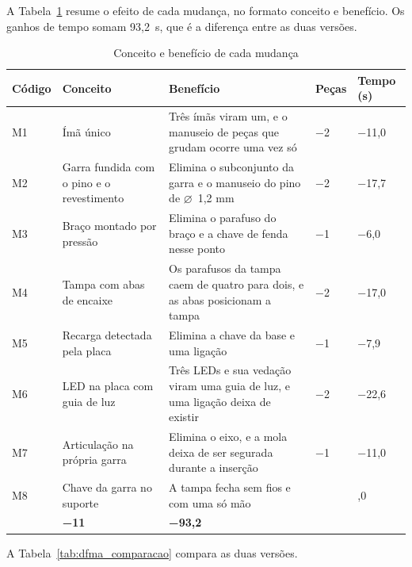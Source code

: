 A Tabela~\ref{tab:dfma_beneficios} resume o efeito de cada mudança, no formato conceito e benefício. Os ganhos de tempo somam 93,2~s, que é a diferença entre as duas versões.

\begin{table}[!htb]
    \centering
    \caption{Conceito e benefício de cada mudança}
    \label{tab:dfma_beneficios}
    \footnotesize
    \renewcommand{\arraystretch}{1.3}
    \begin{tabularx}{\textwidth}{@{}
        >{\RaggedRight\arraybackslash}p{1.1cm}
        >{\RaggedRight\arraybackslash}p{4.4cm}
        >{\RaggedRight\arraybackslash}X
        >{\centering\arraybackslash}p{1.2cm}
        >{\centering\arraybackslash}p{1.7cm}@{}}
        \toprule
        \textbf{Código} & \textbf{Conceito} & \textbf{Benefício} & \textbf{Peças} & \textbf{Tempo (s)} \\
        \midrule
        M1 & Ímã único & Três ímãs viram um, e o manuseio de peças que grudam ocorre uma vez só & −2 & −11,0 \\
        M2 & Garra fundida com o pino e o revestimento & Elimina o subconjunto da garra e o manuseio do pino de $\varnothing$~1,2 mm & −2 & −17,7 \\
        M3 & Braço montado por pressão & Elimina o parafuso do braço e a chave de fenda nesse ponto & −1 & −6,0 \\
        M4 & Tampa com abas de encaixe & Os parafusos da tampa caem de quatro para dois, e as abas posicionam a tampa & −2 & −17,0 \\
        M5 & Recarga detectada pela placa & Elimina a chave da base e uma ligação & −1 & −7,9 \\
        M6 & LED na placa com guia de luz & Três LEDs e sua vedação viram uma guia de luz, e uma ligação deixa de existir & −2 & −22,6 \\
        M7 & Articulação na própria garra & Elimina o eixo, e a mola deixa de ser segurada durante a inserção & −1 & −11,0 \\
        M8 & Chave da garra no suporte & A tampa fecha sem fios e com uma só mão & 0 & 0,0 \\
        \midrule
        \multicolumn{3}{@{}l}{\textbf{Total}} & \textbf{−11} & \textbf{−93,2} \\
        \bottomrule
    \end{tabularx}
\end{table}

A Tabela~\ref{tab:dfma_comparacao} compara as duas versões.

